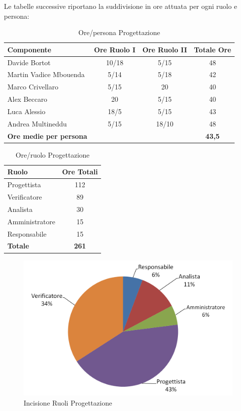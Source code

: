 \documentclass[a4paper,11pt]{article}
\begin{document}
		Le tabelle successive riportano la suddivisione in ore attuata per ogni ruolo e persona:
		\begin{table}[h!]			
		\begin{center}
			\begin{tabular}{l c c c}
			\textbf{Componente} & \textbf{Ore Ruolo I} & \textbf{Ore Ruolo II} & \textbf{Totale Ore}\\
			\midrule
			Davide Bortot & 10/18 & 5/15 & 48\\
			Martin Vadice Mbouenda & 5/14 & 5/18 & 42\\
			Marco Crivellaro & 5/15 & 20 & 40 \\
			Alex Beccaro & 20 & 5/15 & 40\\
			Luca Alessio & 18/5 & 5/15 & 43\\
			Andrea Multineddu & 5/15 & 18/10 & 48\\
			\midrule
			\textbf{Ore medie per persona} & & & \textbf{43,5}\\
			\end{tabular}
		\end{center}
		\caption{Ore/persona Progettazione}
		\end{table}
		\begin{table}[h!]			
		\begin{center}
			\begin{tabular}{l c}
			\textbf{Ruolo} & \textbf{Ore Totali} \\
			\midrule
			Progettista & 112 \\
			Verificatore & 89 \\
			Analista & 30\\
			Amministratore & 15\\
			Responsabile & 15\\
			\midrule
			\textbf{Totale} & \textbf{261}\\
			\end{tabular}
		\end{center}
		\caption{Ore/ruolo Progettazione}
		\end{table}
		\begin{figure}[h!]
		    \centering
			\includegraphics[scale=0.6]{../Images/pie_chart-Progettazione}
			\caption{Incisione Ruoli Progettazione}
		\end{figure}
		
\end{document}
